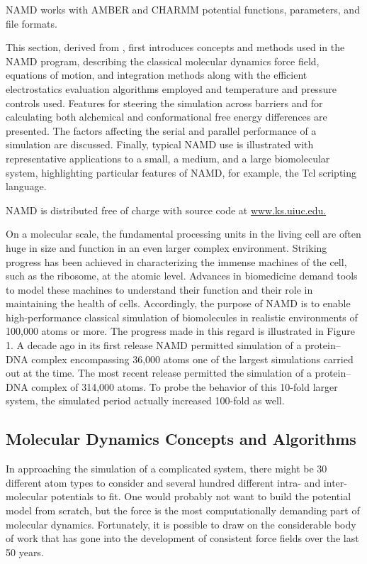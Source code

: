 NAMD works with AMBER and CHARMM potential functions, parameters, and file formats. 

This section, derived from \cite{NAMD}, first introduces concepts and methods used in the NAMD program, describing the classical molecular dynamics force field, equations of motion, and integration methods along with the efficient electrostatics evaluation algorithms employed and temperature and pressure controls used. Features for steering the simulation across barriers and for calculating both alchemical and conformational free energy differences are presented. 
The factors affecting the serial and parallel performance of a simulation are discussed. Finally, typical NAMD use is illustrated with representative applications to a small, a medium, and a large biomolecular system, highlighting particular features of NAMD, for example, the Tcl scripting language. 

NAMD is distributed free of charge with source code at \url{www.ks.uiuc.edu.}


On a molecular scale, the fundamental processing units in the living cell are often huge in size and function in an even larger complex environment. Striking progress has been achieved in characterizing the immense machines of the cell, such as the ribosome, at the atomic level. Advances in biomedicine demand tools to model these machines to understand their function and their role in maintaining the health of cells. Accordingly, the purpose of NAMD is to enable high-performance classical simulation of biomolecules in realistic environments of 100,000 atoms or more. The progress made in this regard is illustrated in Figure 1. A decade ago in its first release NAMD permitted simulation of a protein–DNA complex encompassing 36,000 atoms one of the largest simulations carried out at the time. The most recent release permitted the simulation of a protein–DNA complex of 314,000 atoms. To probe the behavior of this 10-fold larger system, the simulated period actually increased 100-fold as well.


\subsection{Molecular Dynamics Concepts and Algorithms}
In approaching the simulation of a complicated system, there might be 30 different atom types to consider and several hundred different intra- and inter-molecular potentials to fit. One would probably not want to build the potential model from scratch, but the force is the most computationally demanding part of molecular dynamics. Fortunately, it is possible to draw on the considerable body of work that has gone into the development of consistent force fields over the last 50 years.

